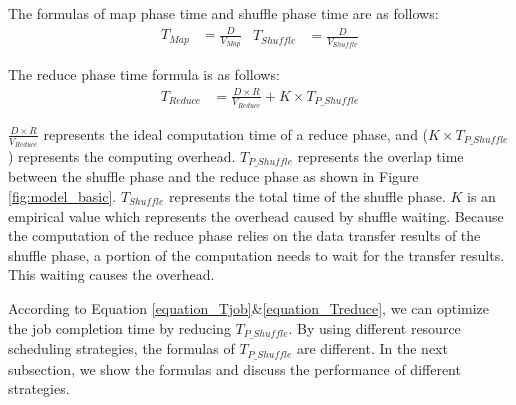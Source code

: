 {The formulas of map phase time and shuffle phase time are as follows:
\begin{equation}
\label{equation_Tmap}
\begin{aligned}
    T_{Map} &= {{\frac{D}{V_{Map}}}}
\end{aligned}
\begin{aligned}
    T_{Shuffle} &= {{\frac{D}{V_{Shuffle}}}}
\end{aligned}
\end{equation}

The reduce phase time formula is as follows:
\begin{equation}
\label{equation_Treduce}
\begin{aligned}
    T_{Reduce} &= \frac{D \times R}{V_{Reduce}} + K \times T_{P\_Shuffle}
\end{aligned}
\end{equation}


{\color{black}
\(\frac{D \times R}{V_{Reduce}}\) represents the ideal computation time of a reduce phase, and (\(K \times T_{P\_Shuffle}\)) represents the computing overhead.
\(T_{P\_Shuffle}\) represents the overlap time between the shuffle phase and the reduce phase as shown in Figure \ref{fig:model_basic}. \(T_{Shuffle}\) represents the total time of the shuffle phase. 
\(K\) is an empirical value which represents the overhead caused by shuffle waiting. 
Because the computation of the reduce phase relies on the data transfer results of the shuffle phase, a portion of the computation needs to wait for the transfer results. This waiting causes the overhead.

According to Equation \ref{equation_Tjob}\&\ref{equation_Treduce}, we can optimize the job completion time by reducing \(T_{P\_Shuffle}\).
By using different resource scheduling strategies, the formulas of \(T_{P\_Shuffle}\) are different.
In the next subsection, we show the formulas and discuss the performance of different strategies.
}	

}
